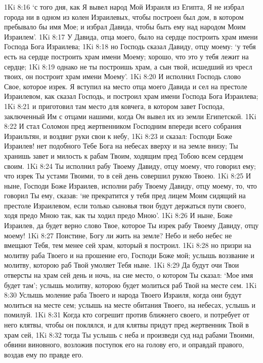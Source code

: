 1Ki 8:16  `с того дня, как Я вывел народ Мой Израиля из Египта, Я не избрал города ни в одном из колен Израилевых, чтобы построен был дом, в котором пребывало бы имя Мое; и избрал Давида, чтобы быть ему над народом Моим Израилем'.
1Ki 8:17  У Давида, отца моего, было на сердце построить храм имени Господа Бога Израилева;
1Ki 8:18  но Господь сказал Давиду, отцу моему: `у тебя есть на сердце построить храм имени Моему; хорошо, что это у тебя лежит на сердце;
1Ki 8:19  однако не ты построишь храм, а сын твой, исшедший из чресл твоих, он построит храм имени Моему'.
1Ki 8:20  И исполнил Господь слово Свое, которое изрек. Я вступил на место отца моего Давида и сел на престоле Израилевом, как сказал Господь, и построил храм имени Господа Бога Израилева;
1Ki 8:21  и приготовил там место для ковчега, в котором завет Господа, заключенный Им с отцами нашими, когда Он вывел их из земли Египетской.
1Ki 8:22  И стал Соломон пред жертвенником Господним впереди всего собрания Израильтян, и воздвиг руки свои к небу,
1Ki 8:23  и сказал: Господи Боже Израилев! нет подобного Тебе Бога на небесах вверху и на земле внизу; Ты хранишь завет и милость к рабам Твоим, ходящим пред Тобою всем сердцем своим.
1Ki 8:24  Ты исполнил рабу Твоему Давиду, отцу моему, что говорил ему; что изрек Ты устами Твоими, то в сей день совершил рукою Твоею.
1Ki 8:25  И ныне, Господи Боже Израилев, исполни рабу Твоему Давиду, отцу моему, то, что говорил Ты ему, сказав: `не прекратится у тебя пред лицем Моим сидящий на престоле Израилевом, если только сыновья твои будут держаться пути своего, ходя предо Мною так, как ты ходил предо Мною'.
1Ki 8:26  И ныне, Боже Израилев, да будет верно слово Твое, которое Ты изрек рабу Твоему Давиду, отцу моему!
1Ki 8:27  Поистине, Богу ли жить на земле? Небо и небо небес не вмещают Тебя, тем менее сей храм, который я построил.
1Ki 8:28  но призри на молитву раба Твоего и на прошение его, Господи Боже мой; услышь воззвание и молитву, которою раб Твой умоляет Тебя ныне.
1Ki 8:29  Да будут очи Твои отверсты на храм сей день и ночь, на сие место, о котором Ты сказал: `Мое имя будет там'; услышь молитву, которою будет молиться раб Твой на месте сем.
1Ki 8:30  Услышь моление раба Твоего и народа Твоего Израиля, когда они будут молиться на месте сем; услышь на месте обитания Твоего, на небесах, услышь и помилуй.
1Ki 8:31  Когда кто согрешит против ближнего своего, и потребует от него клятвы, чтобы он поклялся, и для клятвы придут пред жертвенник Твой в храм сей,
1Ki 8:32  тогда Ты услышь с неба и произведи суд над рабами Твоими, обвини виновного, возложив поступок его на голову его, и оправдай правого, воздав ему по правде его.
